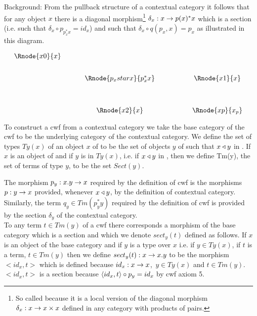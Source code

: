 \note 
Background: From the pullback structure of  a contextual category it follows that for any
object $x$ there is a diagonal morphism\footnote{So called because it is a local version of the diagonal 
morphism $\delta_x:x \rightarrow x \times x$  defined in any category with products of pairs.}
$\delta_x : x \rightarrow p(x)^*x$ which is a section (i.e. such that $\delta_x \circ p_{p_x^*x} = id_x$) and such that $\delta_x \circ q(p_x,x)=p_x$ as illustrated in this diagram.

\vspace{3mm}
\begin{center}
\begin{equation*}
\label{pullback}
\begin{array}{cp{0.5cm}cp{1.2cm}c}
\Rnode{x0}{x} &&                     &&           \\ [0.7cm]
             &&\Rnode{p_xstarx}{p_x^*x} && \Rnode{x1}{x}\\ [1.2cm]
             &&\Rnode{x2}{x}         && \Rnode{xp}{x_p}
\end{array}
\end{equation*}
\setlength{\arrnodesepA}{3pt}
\end{center}

\note To construct a cwf from a contextual category we take the base category of the cwf to be the underlying category of the contextual category. We define the set of types $Ty(x)$ of an object 
$x$ of \catcw to be the set of objects $y$ of \catcw such that $x \triangleleft y$ in \catc. 
If $x$ is an object of \catcw and if $y$ is in $Ty(x)$, i.e. if $x \triangleleft y$ in \catc, then
we define Tm(y), the set of terms of type $y$, to be the set $Sect(y)$.

The morphism $p_y: x.y \rightarrow x$ required by the definition of cwf is the morphisms $p: y \rightarrow x$ provided, whenever $x \triangleleft y$, by the definition of contextual category.
Similarly, the term $q_y \in Tm(p_y ^* y)$ required by the definition of cwf is provided by the 
section $\delta_y$ of the contextual category. \\

\note To any term $t \in Tm(y)$  of a cwf \catcw there corresponds a morphism of the base category which is a section
and which we denote $sect_y(t)$  defined as follows. 
If $x$ is an object of the base category and if 
$y$ is a type over $x$ i.e. if $y \in Ty(x)$, if $t$ is a term, $t \in Tm(y)$ 
then we define $sect_y(t): x \rightarrow x.y$
to be the morphism $<id_x,t>$ which is defined because $id_x : x \rightarrow x$,\ $y \in Ty(x)$ 
and $t \in Tm(y)$.
$<id_x,t>$ is a section because $\langle id_x,t\rangle \circ p_y=id_x$ by cwf axiom 5. \\

